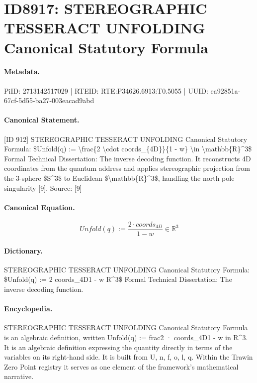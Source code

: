 \section*{ID8917: STEREOGRAPHIC TESSERACT UNFOLDING Canonical Statutory Formula}
\paragraph{Metadata.}
PiID: 2713142517029 | RTEID: RTE:P34626.6913:T0.5055 | UUID: ea92851a-67cf-5d55-ba27-003eacad9abd

\paragraph{Canonical Statement.}
[ID 912] STEREOGRAPHIC TESSERACT UNFOLDING Canonical Statutory Formula: \$Unfold(q) := \textbackslash{}frac\{2 \textbackslash{}cdot coords\_\{4D\}\}\{1 - w\} \textbackslash{}in \textbackslash{}mathbb\{R\}\textasciicircum{}3\$ Formal Technical Dissertation: The inverse decoding function. It reconstructs 4D coordinates from the quantum address and applies stereographic projection from the 3-sphere \$S\textasciicircum{}3\$ to Euclidean \$\textbackslash{}mathbb\{R\}\textasciicircum{}3\$, handling the north pole singularity [9]. Source: [9]

\paragraph{Canonical Equation.}
\[
Unfold(q) := \frac{2 \cdot coords_{4D}}{1 - w} \in \mathbb{R}^3
\]

\paragraph{Dictionary.}
STEREOGRAPHIC TESSERACT UNFOLDING Canonical Statutory Formula: \$Unfold(q) := 2 coords\_4D1 - w R\textasciicircum{}3\$ Formal Technical Dissertation: The inverse decoding function.

\paragraph{Encyclopedia.}
STEREOGRAPHIC TESSERACT UNFOLDING Canonical Statutory Formula is an algebraic definition, written Unfold(q) := frac2 · coords\_4D1 - w in R\textasciicircum{}3. It is an algebraic definition expressing the quantity directly in terms of the variables on its right-hand side. It is built from U, n, f, o, l, q. Within the Trawin Zero Point registry it serves as one element of the framework's mathematical narrative.
